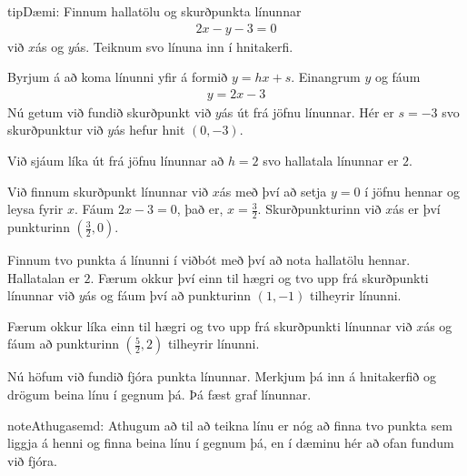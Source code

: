 \documentclass[a4paper,10pt,icelandic]{sphinxmanual}
\begin{document}
\begin{sphinxadmonition}{tip}{Dæmi:}
Finnum hallatölu og skurðpunkta línunnar
\begin{equation*}
\begin{split}2x-y-3=0\end{split}
\end{equation*}
við \(x\)\sphinxhyphen{}ás og \(y\)\sphinxhyphen{}ás. Teiknum svo línuna inn í hnitakerfi.

Byrjum á að koma línunni yfir á formið \(y=hx+s\). Einangrum \(y\) og fáum
\begin{equation*}
\begin{split}y=2x-3\end{split}
\end{equation*}
Nú getum við fundið skurðpunkt við \(y\)\sphinxhyphen{}ás út frá jöfnu línunnar. Hér er \(s=-3\) svo skurðpunktur við \(y\)\sphinxhyphen{}ás hefur hnit \((0,-3)\).

Við sjáum líka út frá jöfnu línunnar að \(h=2\) svo hallatala línunnar er \(2\).

Við finnum skurðpunkt línunnar við \(x\)\sphinxhyphen{}ás með því að setja \(y=0\) í jöfnu hennar og leysa fyrir \(x\). Fáum \(2x-3=0\), það er, \(x=\frac{3}{2}\). Skurðpunkturinn við \(x\)\sphinxhyphen{}ás er því punkturinn \((\frac{3}{2},0)\).

Finnum tvo punkta á línunni í viðbót með því að nota hallatölu hennar. Hallatalan er \(2\).
Færum okkur því einn til hægri og tvo upp frá skurðpunkti línunnar við \(y\)\sphinxhyphen{}ás og fáum því að punkturinn \((1,-1)\) tilheyrir línunni.

Færum okkur líka einn til hægri og tvo upp frá skurðpunkti línunnar við \(x\)\sphinxhyphen{}ás og fáum að punkturinn \((\frac{5}{2}, 2)\) tilheyrir línunni.

Nú höfum við fundið fjóra punkta línunnar. Merkjum þá inn á hnitakerfið og drögum beina línu í gegnum þá. Þá fæst graf línunnar.

\end{sphinxadmonition}

\begin{sphinxadmonition}{note}{Athugasemd:}
Athugum að til að teikna línu er nóg að finna tvo punkta sem liggja á henni og finna beina línu í gegnum þá, en í dæminu hér að ofan fundum við fjóra.
\end{sphinxadmonition}
\end{document}
